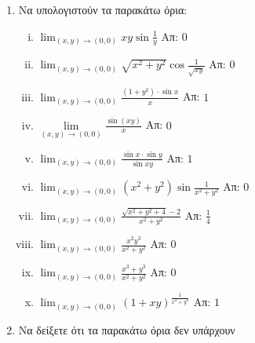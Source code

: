 



\everymath{\displaystyle}



\begin{center}
\end{center}


\vspace{\baselineskip}

\begin{enumerate}
    \item Να υπολογιστούν τα παρακάτω όρια:
        \begin{enumerate}[i)]
            \item $ \lim_{(x,y)\to (0,0)} xy\sin{\frac{1}{y}} $ \hfill Απ: $ 0 $
            \item $ \lim_{(x,y)\to (0,0)} \sqrt{ x^{2} + y^{2}} 
                \cos{\frac{1}{\sqrt{xy}}} $ \hfill Απ: $ 0 $
            \item $ \lim_{(x,y)\to (0,0)} \frac{ (1+y^{2})\cdot \sin{x} }{ x } $ 
                \hfill Απ: $ 1 $
            \item $\lim\limits_{(x,y)\to (0,0)}\frac{\sin(xy)}{x}$ \hfill Απ: $0$
            \item $ \lim_{(x,y)\to (0,0)} \frac{ \sin{x} \cdot \sin{y} }{ \sin{xy} } $ 
                \hfill Απ: $ 1 $
            \item $ \lim_{(x,y)\to (0,0)} (x^{2} + y^{2}) 
                \sin{\frac{1}{x^{2} + y^{2} }} $ \hfill Απ: $ 0 $ 
            \item $ \lim_{(x,y)\to (0,0)} \frac{\sqrt{x^{2}+y^{2}+4 } - 2 }
                { x^{2}+y^{2} } $ \hfill Απ: $ \frac{ 1 }{ 4 } $
            \item $ \lim_{(x,y)\to (0,0)} \frac{x^{2}y^{3} }{x^{2}+y^{2}}    $ 
                \hfill Απ: $0 $ 
            \item $ \lim_{(x,y)\to (0,0)} \frac{x^{3}+y^{3} }{ x^{2}+y^{2} } $ 
                \hfill Απ: $ 0 $
            \item $ \lim_{(x,y)\to (0,0)} (1+xy)^{\frac{1}{x^{2}+y^{2}}} $ 
                \hfill Απ: $ 1 $
        \end{enumerate}

    \item Να δείξετε ότι τα παρακάτω όρια δεν υπάρχουν


\end{enumerate}
